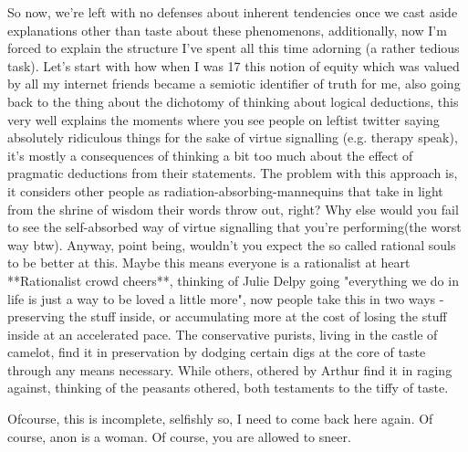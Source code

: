 So now, we're left with no defenses about inherent tendencies once we cast aside explanations other than taste about these phenomenons, additionally, now I'm forced to explain the structure I've spent all this time adorning (a rather tedious task). Let's start with how when I was 17 this notion of equity which was valued by all my internet friends became a semiotic identifier of truth for me, also going back to the thing about the dichotomy of thinking about logical deductions, this very well explains the moments where you see people on leftist twitter saying absolutely ridiculous things for the sake of virtue signalling (e.g. therapy speak), it's mostly a consequences of thinking a bit too much about the effect of pragmatic deductions from their statements. The problem with this approach is, it considers other people as radiation-absorbing-mannequins that take in light from the shrine of wisdom their words throw out, right? Why else would you fail to see the self-absorbed way of virtue signalling that you're performing(the worst way btw). Anyway, point being, wouldn't you expect the so called rational souls to be better at this. Maybe this means everyone is a rationalist at heart **Rationalist crowd cheers**, thinking of Julie Delpy going "everything we do in life is just a way to be loved a little more", now people take this in two ways - preserving the stuff inside, or accumulating more at the cost of losing the stuff inside at an accelerated pace. The conservative purists, living in the castle of camelot, find it in preservation by dodging certain digs at the core of taste through any means necessary. While others, othered by Arthur find it in raging against, thinking of the peasants othered, both testaments to the tiffy of taste.

Ofcourse, this is incomplete, selfishly so, I need to come back here again. Of course, anon is a woman. Of course, you are allowed to sneer.
\clearpage